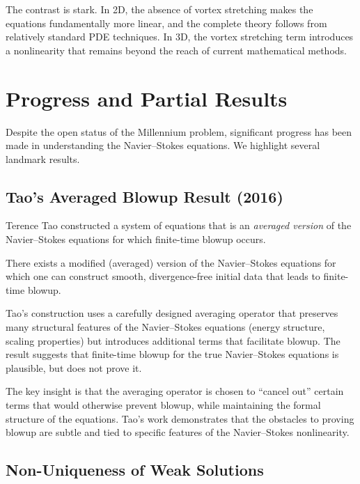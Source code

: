 The contrast is stark. In 2D, the absence of vortex stretching makes the equations fundamentally more linear, and the complete theory follows from relatively standard PDE techniques. In 3D, the vortex stretching term introduces a nonlinearity that remains beyond the reach of current mathematical methods.

\section{Progress and Partial Results}
\label{sec:NS-progress}

Despite the open status of the Millennium problem, significant progress has been made in understanding the Navier--Stokes equations. We highlight several landmark results.

\subsection{Tao's Averaged Blowup Result (2016)}

Terence Tao constructed a system of equations that is an \emph{averaged version} of the Navier--Stokes equations for which finite-time blowup occurs.

\begin{theorem}[Tao, 2016]
\label{thm:tao}
There exists a modified (averaged) version of the Navier--Stokes equations for which one can construct smooth, divergence-free initial data that leads to finite-time blowup.
\end{theorem}

Tao's construction uses a carefully designed averaging operator that preserves many structural features of the Navier--Stokes equations (energy structure, scaling properties) but introduces additional terms that facilitate blowup. The result suggests that finite-time blowup for the true Navier--Stokes equations is plausible, but does not prove it.

The key insight is that the averaging operator is chosen to ``cancel out'' certain terms that would otherwise prevent blowup, while maintaining the formal structure of the equations. Tao's work demonstrates that the obstacles to proving blowup are subtle and tied to specific features of the Navier--Stokes nonlinearity.

\subsection{Non-Uniqueness of Weak Solutions}

